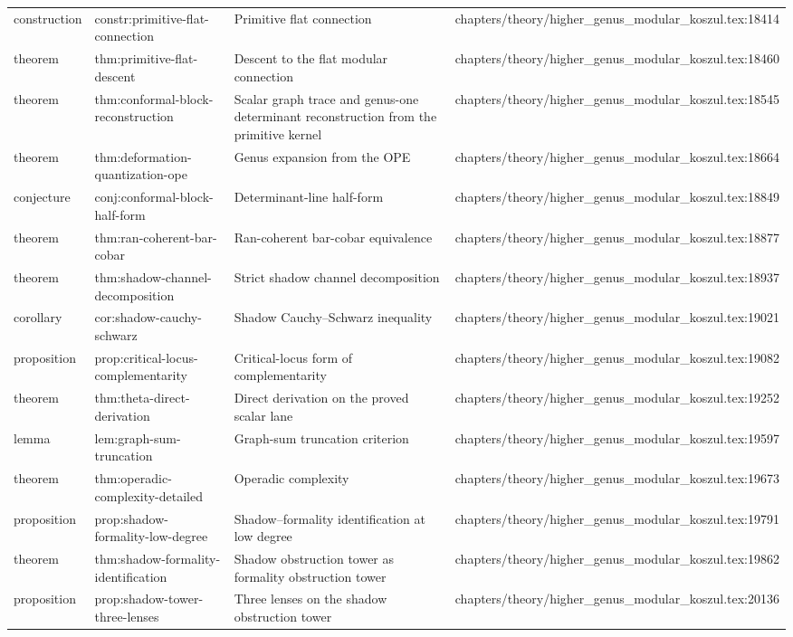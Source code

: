 \documentclass[11pt]{article}
\begin{document}
\begin{longtable}{L{0.10\textwidth}L{0.26\textwidth}L{0.42\textwidth}L{0.22\textwidth}}
construction & constr:primitive-flat-connection & Primitive flat connection & chapters/theory/higher\_genus\_modular\_koszul.tex:18414\\
theorem & thm:primitive-flat-descent & Descent to the flat modular connection & chapters/theory/higher\_genus\_modular\_koszul.tex:18460\\
theorem & thm:conformal-block-reconstruction & Scalar graph trace and genus-one determinant reconstruction from the primitive kernel & chapters/theory/higher\_genus\_modular\_koszul.tex:18545\\
theorem & thm:deformation-quantization-ope & Genus expansion from the OPE & chapters/theory/higher\_genus\_modular\_koszul.tex:18664\\
conjecture & conj:conformal-block-half-form & Determinant-line half-form & chapters/theory/higher\_genus\_modular\_koszul.tex:18849\\
theorem & thm:ran-coherent-bar-cobar & Ran-coherent bar-cobar equivalence & chapters/theory/higher\_genus\_modular\_koszul.tex:18877\\
theorem & thm:shadow-channel-decomposition & Strict shadow channel decomposition & chapters/theory/higher\_genus\_modular\_koszul.tex:18937\\
corollary & cor:shadow-cauchy-schwarz & Shadow Cauchy--Schwarz inequality & chapters/theory/higher\_genus\_modular\_koszul.tex:19021\\
proposition & prop:critical-locus-complementarity & Critical-locus form of complementarity & chapters/theory/higher\_genus\_modular\_koszul.tex:19082\\
theorem & thm:theta-direct-derivation & Direct derivation on the proved scalar lane & chapters/theory/higher\_genus\_modular\_koszul.tex:19252\\
lemma & lem:graph-sum-truncation & Graph-sum truncation criterion & chapters/theory/higher\_genus\_modular\_koszul.tex:19597\\
theorem & thm:operadic-complexity-detailed & Operadic complexity & chapters/theory/higher\_genus\_modular\_koszul.tex:19673\\
proposition & prop:shadow-formality-low-degree & Shadow--formality identification at low degree & chapters/theory/higher\_genus\_modular\_koszul.tex:19791\\
theorem & thm:shadow-formality-identification & Shadow obstruction tower as formality obstruction tower & chapters/theory/higher\_genus\_modular\_koszul.tex:19862\\
proposition & prop:shadow-tower-three-lenses & Three lenses on the shadow obstruction tower & chapters/theory/higher\_genus\_modular\_koszul.tex:20136\\

\end{longtable}
\end{document}
